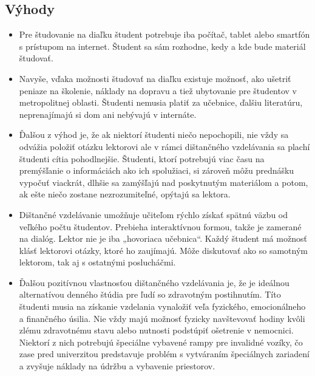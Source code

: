 \documentclass[10pt,oneside,slovak,a4paper]{article}
\begin{document}
\subsection{Výhody}
\begin{itemize}
	\item Pre študovanie na diaľku študent potrebuje iba počítač, tablet alebo smartfón s prístupom na internet. Študent sa sám rozhodne, kedy a kde bude materiál študovať.
	\item Navyše, vďaka možnosti študovať na diaľku existuje možnosť, ako ušetriť peniaze na školenie, náklady na dopravu a tiež ubytovanie pre študentov v metropolitnej oblasti.
	Študenti nemusia platiť za učebnice, ďalšiu literatúru, neprenajímajú si dom ani nebývajú v internáte.
	\item Ďalšou z výhod je, že ak niektorí študenti niečo nepochopili, nie vždy sa odvážia položiť otázku lektorovi ale v rámci dištančného vzdelávania sa plachí študenti cítia pohodlnejšie.
	Študenti, ktorí potrebujú viac času na premýšľanie o informáciách ako ich spolužiaci, si zároveň môžu prednášku vypočuť viackrát, dlhšie sa zamýšľajú nad poskytnutým materiálom a potom, ak ešte niečo zostane nezrozumiteľné, opýtajú sa lektora.
	\item Dištančné vzdelávanie umožňuje učiteľom rýchlo získať spätnú väzbu od veľkého počtu študentov. Prebieha interaktívnou formou, takže je zamerané na dialóg.
	Lektor nie je iba „hovoriaca učebnica“. Každý študent má možnosť klásť lektorovi otázky, ktoré ho zaujímajú. Môže diskutovať ako so samotným lektorom, tak aj s ostatnými poslucháčmi.
	\item Ďalšou pozitívnou vlastnosťou dištančného vzdelávania je, že je ideálnou alternatívou denného štúdia pre ľudí so zdravotným postihnutím.
	Títo študenti musia na získanie vzdelania vynaložiť veľa fyzického, emocionálneho a finančného úsilia.
	Nie vždy majú možnosť fyzicky navštevovať hodiny kvôli zlému zdravotnému stavu alebo nutnosti podstúpiť ošetrenie v nemocnici.
	Niektorí z nich potrebujú špeciálne vybavené rampy pre invalidné vozíky, čo zase pred univerzitou predstavuje problém s vytváraním špeciálnych zariadení a zvyšuje náklady na údržbu a vybavenie priestorov.
\end{itemize}
\end{document}
